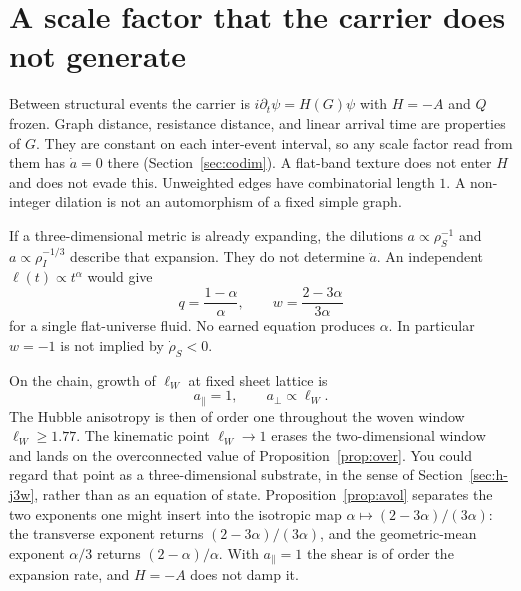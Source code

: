 \section{A scale factor that the carrier does not generate}
\label{sec:h-de}

Between structural events the carrier is
\(i\partial_t\psi=H(G)\psi\) with \(H=-A\) and \(Q\) frozen.
Graph distance, resistance distance, and linear arrival time are
properties of \(G\).
They are constant on each inter-event interval, so any scale factor read
from them has \(\dot a=0\) there (Section~\ref{sec:codim}).
A flat-band texture does not enter \(H\) and does not evade this.
Unweighted edges have combinatorial length \(1\).
A non-integer dilation is not an automorphism of a fixed simple graph.

If a three-dimensional metric is already expanding, the dilutions
\(a\propto\rho_S^{-1}\) and \(a\propto\rho_I^{-1/3}\) describe that
expansion.
They do not determine \(\ddot a\).
An independent \(\ell(t)\propto t^\alpha\) would give
\[
q=\frac{1-\alpha}{\alpha},\qquad
w=\frac{2-3\alpha}{3\alpha}
\]
for a single flat-universe fluid.
No earned equation produces \(\alpha\).
In particular \(w=-1\) is not implied by \(\dot\rho_S<0\).

On the chain, growth of \(\ell_W\) at fixed sheet lattice is
\[
a_\parallel=1,\qquad a_\perp\propto\ell_W.
\]
The Hubble anisotropy is then of order one throughout the woven window
\(\ell_W\ge 1.77\).
The kinematic point \(\ell_W\to 1\) erases the two-dimensional window and
lands on the overconnected value of Proposition~\ref{prop:over}.
You could regard that point as a three-dimensional substrate, in the sense
of Section~\ref{sec:h-j3w}, rather than as an equation of state.
Proposition~\ref{prop:avol} separates the two exponents one might insert
into the isotropic map \(\alpha\mapsto(2-3\alpha)/(3\alpha)\):
the transverse exponent returns \((2-3\alpha)/(3\alpha)\), and the
geometric-mean exponent \(\alpha/3\) returns \((2-\alpha)/\alpha\).
With \(a_\parallel=1\) the shear is of order the expansion rate, and
\(H=-A\) does not damp it.
